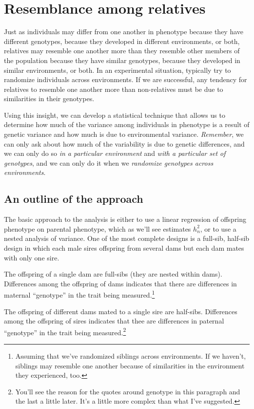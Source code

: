 \chapter{Resemblance among relatives}

Just as individuals may differ from one another in phenotype because
they have different genotypes, because they developed in different
environments, or both, relatives may resemble one another more than
they resemble other members of the population because they have
similar genotypes, because they developed in similar environments, or
both. In an experimental situation, typically try to randomize
individuals across environments. If we are successful, any tendency
for relatives to resemble one another more than non-relatives must be
due to similarities in their genotypes.

Using this insight, we can develop a statistical technique that allows
us to determine how much of the variance among individuals in
phenotype is a result of genetic variance and how much is due to
environmental variance. {\it Remember}, we can only ask about how much
of the variability is due to genetic differences, and we can only do
so {\it in a particular environment\/} and {\it with a particular set
of genotypes}, and we can only do it when we {\it randomize genotypes
  across environments}.

\section*{An outline of the approach}

The basic approach to the analysis is either to use a linear
regression of offspring phenotype on parental phenotype, which as
we'll see estimates $h^2_n$, or to use a nested analysis of
variance. One of the most complete designs is a full-sib, half-sib
design in which each male sires offspring from several dams but each
dam mates with only one sire.

The offspring of a single dam are full-sibs (they are nested within
dams). Differences among the offspring of dams indicates that there
are differences in maternal ``genotype'' in the trait being
measured.\footnote{Assuming that we've randomized siblings across
  environments. If we haven't, siblings may resemble one another
  because of similarities in the environment they experienced, too.}

The offspring of different dams mated to a single sire are
half-sibs. Differences among the offspring of sires indicates that
thee are differences in paternal ``genotype'' in the trait being
measured.\footnote{You'll see the reason for the quotes around
  genotype in this paragraph and the last a little later. It's a
  little more complex than what I've suggested.}

